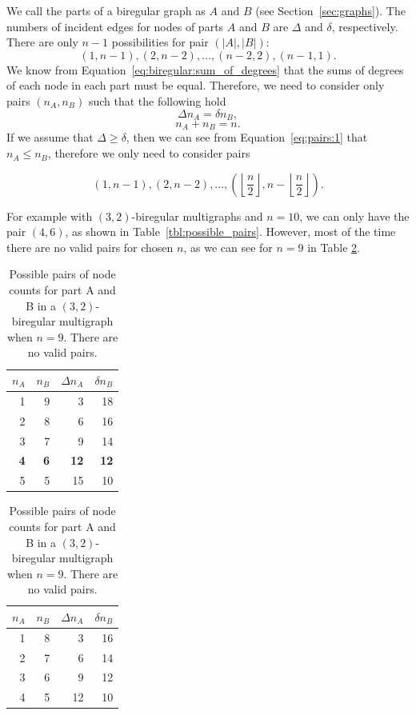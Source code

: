 We call the parts of a biregular graph as $A$ and $B$ (see Section~\ref{sec:graphs}).
The numbers of incident edges for nodes of parts $A$ and $B$ are $\Delta$ and $\delta$, respectively.
There are only $n-1$ possibilities for pair $(|A|, |B|)$:
$$(1, n-1), (2, n-2), ..., (n-2, 2), (n-1, 1).$$
We know from Equation~\ref{eq:biregular:sum_of_degrees} that the sums of degrees of each node in each part must be equal.
Therefore, we need to consider only pairs $(n_A, n_B)$ such that the following hold
\begin{equation} \label{eq:pairs:1}
  \Delta n_A = \delta n_B,
\end{equation}
\begin{equation} \label{eq:pairs:2}
n_A + n_B = n.
\end{equation}
If we assume that $\Delta \geq \delta$, then we can see from Equation~\ref{eq:pairs:1} that $n_A\leq n_B$, therefore we only need to consider pairs

$$(1, n-1), (2, n-2), ..., (\left\lfloor\frac{n}{2}\right\rfloor, n - \left\lfloor\frac{n}{2}\right\rfloor).$$

For example with $(3,2)$-biregular multigraphs and $n=10$, we can only have the pair $(4, 6)$, as shown in Table~\ref{tbl:possible_pairs}.
However, most of the time there are no valid pairs for chosen $n$, as we can see for $n=9$ in Table \ref{tbl:possible_pairs:no_pairs}.

\begin{table}[H]
  \parbox{.45\linewidth}{
    \centering
    \begin{tabular}{rrrr}
    \toprule
    $n_A$&$n_B$&$\Delta n_A$&$\delta n_B$\\
    \midrule
    1 & 9 & 3  & 18\\
    2 & 8 & 6  & 16\\
    3 & 7 & 9  & 14\\
    \textbf{4} & \textbf{6} & \textbf{12} & \textbf{12}\\
    5 & 5 & 15 & 10\\
    \bottomrule
  \end{tabular}
  \caption{
    Possible pairs of node counts for part A and B in a $(3,2)$-biregular multigraph when $n=10$.
    The only valid pair with $\Delta n_A = \delta n_B$ is (4, 6), and it is bolded.
  }
  \label{tbl:possible_pairs}
  }
  \hfill
  \parbox{.45\linewidth}{
  \centering
  \begin{tabular}{rrrr}
    \toprule
    $n_A$&$n_B$&$\Delta n_A$&$\delta n_B$\\
    \midrule
    1 & 8 & 3  & 16\\
    2 & 7 & 6  & 14\\
    3 & 6 & 9  & 12\\
    4 & 5 & 12 & 10\\
    \bottomrule
  \end{tabular}
  \caption{
    Possible pairs of node counts for part A and B in a $(3,2)$-biregular multigraph when $n=9$.
    There are no valid pairs.
  }
  \label{tbl:possible_pairs:no_pairs}
  }
\end{table}

